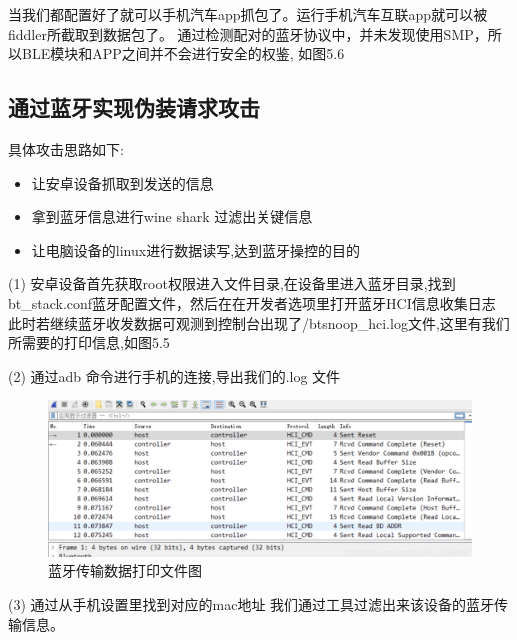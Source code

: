 当我们都配置好了就可以手机汽车app抓包了。运行手机汽车互联app就可以被fiddler所截取到数据包了。
通过检测配对的蓝牙协议中，并未发现使用SMP，所以BLE模块和APP之间并不会进行安全的权鉴, 如图5.6
\newline
\subsection{通过蓝牙实现伪装请求攻击}
具体攻击思路如下\cite{von2021method}:
\begin{itemize}
    \item 让安卓设备抓取到发送的信息
    \item 拿到蓝牙信息进行wine shark 过滤出关键信息
    \item 让电脑设备的linux进行数据读写,达到蓝牙操控的目的
\end{itemize}

(1) 安卓设备首先获取root权限进入文件目录,在设备里进入蓝牙目录,找到bt\_stack.conf蓝牙配置文件，然后在在开发者选项里打开蓝牙HCI信息收集日志
此时若继续蓝牙收发数据可观测到控制台出现了/btsnoop\_hci.log文件,这里有我们所需要的打印信息,如图5.5

(2) 通过adb 命令进行手机的连接,导出我们的.log 文件
\begin{figure}
    \centering
    \includegraphics[scale=0.5]{resources/img/i17.png}
    \caption{蓝牙传输数据打印文件图}
  \end{figure}
(3) 通过从手机设置里找到对应的mac地址 我们通过工具过滤出来该设备的蓝牙传输信息。
  
